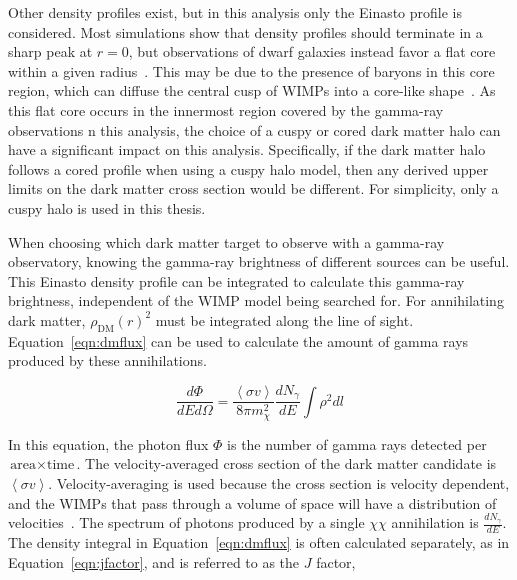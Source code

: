     Other density profiles exist, but in this analysis only the Einasto profile is considered.
    Most simulations show that density profiles should terminate in a sharp peak at $r=0$, but observations of dwarf galaxies instead favor a flat core within a given radius~\cite{flores1994observational,CoreVsCusp}.
    This may be due to the presence of baryons in this core region, which can diffuse the central cusp of WIMPs into a core-like shape~\cite{corecusp_baryondiffuse1,corecusp_baryondiffuse2}.
    As this flat core occurs in the innermost region covered by the gamma-ray observations n this analysis, the choice of a cuspy or cored dark matter halo can have a significant impact on this analysis.
    Specifically, if the dark matter halo follows a cored profile when using a cuspy halo model, then any derived upper limits on the dark matter cross section would be different.
    For simplicity, only a cuspy halo is used in this thesis.
    
    When choosing which dark matter target to observe with a gamma-ray observatory, knowing the gamma-ray brightness of different sources can be useful.
    This Einasto density profile can be integrated to calculate this gamma-ray brightness, independent of the WIMP model being searched for.
    For annihilating dark matter, $\rho_{\textrm{DM}}\left(r\right)^2$ must be integrated along the line of sight.
    Equation~\ref{eqn:dmflux} can be used to calculate the amount of gamma rays produced by these annihilations.
    
    \begin{equation}\label{eqn:dmflux}
      \frac{ d\Phi }{ dE d \Omega } = \frac{ \left \langle \sigma v \right \rangle }{8 \pi m_\chi^2} \frac{dN_{\gamma}}{dE} \int \rho^2 dl
    \end{equation}
    
    In this equation, the photon flux $\Phi$ is the number of gamma rays detected per $\textrm{area}\times\textrm{time}$.
    The velocity-averaged cross section of the dark matter candidate is $\left \langle \sigma v \right \rangle$.
    Velocity-averaging is used because the cross section is velocity dependent, and the WIMPs that pass through a volume of space will have a distribution of velocities~\cite{wimp_veldist}.
    The spectrum of photons produced by a single $\chi\chi$ annihilation is $\frac{dN_{\gamma}}{dE}$.
    The density integral in Equation~\ref{eqn:dmflux} is often calculated separately, as in Equation~\ref{eqn:jfactor}, and is referred to as the $J$ factor,

